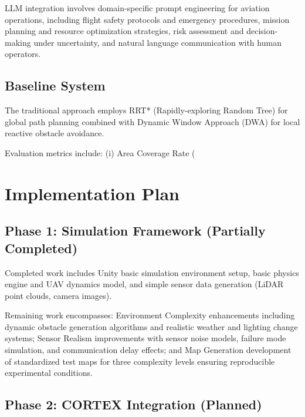 LLM integration involves domain-specific prompt engineering for aviation operations, including flight safety protocols and emergency procedures, mission planning and resource optimization strategies, risk assessment and decision-making under uncertainty, and natural language communication with human operators.

\subsection{Baseline System}

The traditional approach employs RRT* (Rapidly-exploring Random Tree) for global path planning combined with Dynamic Window Approach (DWA) for local reactive obstacle avoidance.

Evaluation metrics include: (i) Area Coverage Rate (%

\section{Implementation Plan}

\subsection{Phase 1: Simulation Framework (Partially Completed)}

Completed work includes Unity basic simulation environment setup, basic physics engine and UAV dynamics model, and simple sensor data generation (LiDAR point clouds, camera images).

Remaining work encompasses: Environment Complexity enhancements including dynamic obstacle generation algorithms and realistic weather and lighting change systems; Sensor Realism improvements with sensor noise models, failure mode simulation, and communication delay effects; and Map Generation development of standardized test maps for three complexity levels ensuring reproducible experimental conditions.

\subsection{Phase 2: CORTEX Integration (Planned)}

